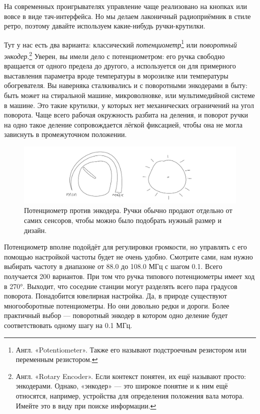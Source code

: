 На современных проигрывателях управление чаще реализовано на кнопках или вовсе в виде тач-интерфейса. Но мы делаем лаконичный радиоприёмник в стиле ретро, поэтому давайте используем какие-нибудь ручки-крутилки.

Тут у нас есть два варианта: классический \emph{потенциометр}\footnote{Англ.  «Potentiometer». Также его называют подстроечным резистором или переменным резистором.} или \emph{поворотный энкодер}.\footnote{Англ.  «Rotary Encoder». Если контекст понятен, их ещё называют просто: энкодерами. Однако, «энкодер» — это широкое понятие и к ним ещё относятся, например, устройства для определения положения вала мотора.  Имейте это в виду при поиске информации.} Уверен, вы имели дело с потенциометром: его ручка свободно вращается от одного предела до другого, а используется он для примерного выставления параметра вроде температуры в морозилке или температуры обогревателя. Вы наверняка сталкивались и с поворотными энкодерами в быту: быть может на стиральной машине, микроволновке, или мультимедийной системе в машине. Это такие крутилки, у которых нет механических ограничений на угол поворота. Чаще всего рабочая окружность разбита на деления, и поворот ручки на одно такое деление сопровождается лёгкой фиксацией, чтобы она не могла зависнуть в промежуточном положении.

\begin{figure}
  \centering
  \includegraphics{sketches/pot-vs-encoder}
  \caption{Потенциометр против энкодера. Ручки обычно продают отдельно от
  самих сенсоров, чтобы можно было подобрать нужный размер и дизайн.}
\end{figure}

Потенциометр вполне подойдёт для регулировки громкости, но управлять с его помощью настройкой частоты будет не очень удобно. Смотрите сами, нам нужно выбирать частоту в диапазоне от 88.0 до 108.0 МГц с шагом 0.1. Всего получается 200 вариантов. При том что ручка типового потенциометры имеет ход в 270°. Выходит, что соседние станции могут разделять всего пара градусов поворота. Понадобится ювелирная настройка. Да, в природе существуют многооборотные потенциометры. Но они довольно редки и дороги. Более практичный выбор — поворотный энкодер в котором одно деление будет соответствовать одному шагу на 0.1 МГц.

